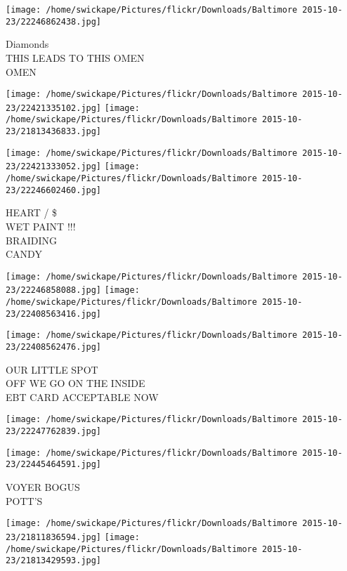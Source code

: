 \documentclass[10pt,letterpaper]{article}
\begin{document}
\vspace{0.25in}
\texttt{[image: /home/swickape/Pictures/flickr/Downloads/Baltimore 2015-10-23/22246862438.jpg]}

Diamonds\\
THIS LEADS TO THIS OMEN\\
OMEN\\
\pagebreak

\texttt{[image: /home/swickape/Pictures/flickr/Downloads/Baltimore 2015-10-23/22421335102.jpg]}
\texttt{[image: /home/swickape/Pictures/flickr/Downloads/Baltimore 2015-10-23/21813436833.jpg]}

\texttt{[image: /home/swickape/Pictures/flickr/Downloads/Baltimore 2015-10-23/22421333052.jpg]}
\texttt{[image: /home/swickape/Pictures/flickr/Downloads/Baltimore 2015-10-23/22246602460.jpg]}

HEART / \$\\
WET PAINT !!!\\
BRAIDING\\
CANDY\\
\pagebreak

\texttt{[image: /home/swickape/Pictures/flickr/Downloads/Baltimore 2015-10-23/22246858088.jpg]}
\texttt{[image: /home/swickape/Pictures/flickr/Downloads/Baltimore 2015-10-23/22408563416.jpg]}

\texttt{[image: /home/swickape/Pictures/flickr/Downloads/Baltimore 2015-10-23/22408562476.jpg]}

OUR LITTLE SPOT\\
OFF WE GO ON THE INSIDE\\
EBT CARD ACCEPTABLE NOW\\
\pagebreak

\texttt{[image: /home/swickape/Pictures/flickr/Downloads/Baltimore 2015-10-23/22247762839.jpg]}

\vspace{0.25in}
\texttt{[image: /home/swickape/Pictures/flickr/Downloads/Baltimore 2015-10-23/22445464591.jpg]}

VOYER BOGUS\\
POTT'S\\
\pagebreak

\texttt{[image: /home/swickape/Pictures/flickr/Downloads/Baltimore 2015-10-23/21811836594.jpg]}
\texttt{[image: /home/swickape/Pictures/flickr/Downloads/Baltimore 2015-10-23/21813429593.jpg]}
\end{document}
